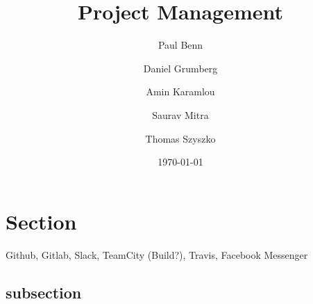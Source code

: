 \documentclass[a4wide, 11pt]{article}
\begin{document}
\title{Project Management}

\author{Paul Benn \and Daniel Grumberg \and Amin Karamlou \and Saurav Mitra \and Thomas Szyszko }

\date{\today}

\maketitle

\clearpage

\section{Section}

Github, Gitlab, Slack, TeamCity (Build?), Travis, Facebook Messenger

\subsection{subsection} 
\end{document}
